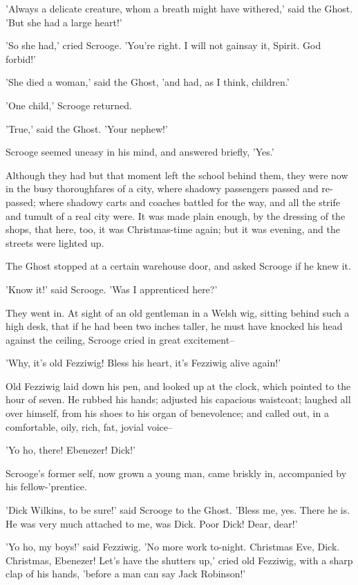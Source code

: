'Always a delicate creature, whom a breath might have withered,' said
the Ghost. 'But she had a large heart!'

'So she had,' cried Scrooge. 'You're right. I will not gainsay it,
Spirit. God forbid!'

'She died a woman,' said the Ghost, 'and had, as I think, children.'

'One child,' Scrooge returned.

'True,' said the Ghost. 'Your nephew!'

Scrooge seemed uneasy in his mind, and answered briefly, 'Yes.'

Although they had but that moment left the school behind them, they were
now in the busy thoroughfares of a city, where shadowy passengers passed
and re-passed; where shadowy carts and coaches battled for the way, and
all the strife and tumult of a real city were. It was made plain enough,
by the dressing of the shops, that here, too, it was Christmas-time
again; but it was evening, and the streets were lighted up.

The Ghost stopped at a certain warehouse door, and asked Scrooge if he
knew it.

'Know it!' said Scrooge. 'Was I apprenticed here?'

They went in. At sight of an old gentleman in a Welsh wig, sitting
behind such a high desk, that if he had been two inches taller, he must
have knocked his head against the ceiling, Scrooge cried in great
excitement--

'Why, it's old Fezziwig! Bless his heart, it's Fezziwig alive again!'

Old Fezziwig laid down his pen, and looked up at the clock, which
pointed to the hour of seven. He rubbed his hands; adjusted his
capacious waistcoat; laughed all over himself, from his shoes to his
organ of benevolence; and called out, in a comfortable, oily, rich, fat,
jovial voice--

'Yo ho, there! Ebenezer! Dick!'

Scrooge's former self, now grown a young man, came briskly in,
accompanied by his fellow-'prentice.

'Dick Wilkins, to be sure!' said Scrooge to the Ghost. 'Bless me, yes.
There he is. He was very much attached to me, was Dick. Poor Dick! Dear,
dear!'

'Yo ho, my boys!' said Fezziwig. 'No more work to-night. Christmas Eve,
Dick. Christmas, Ebenezer! Let's have the shutters up,' cried old
Fezziwig, with a sharp clap of his hands, 'before a man can say Jack
Robinson!'


